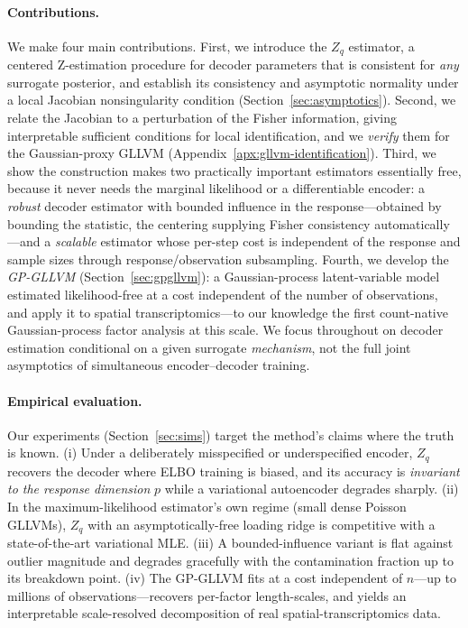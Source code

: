 \documentclass[twoside,11pt]{article}
\begin{document}
\paragraph{Contributions.}
We make four main contributions.
First, we introduce the $Z_q$ estimator, a centered Z-estimation procedure for decoder parameters that is consistent for \emph{any} surrogate posterior, and establish its consistency and asymptotic normality under a local Jacobian nonsingularity condition (Section~\ref{sec:asymptotics}).
Second, we relate the Jacobian to a perturbation of the Fisher information, giving interpretable sufficient conditions for local identification, and we \emph{verify} them for the Gaussian-proxy GLLVM (Appendix~\ref{apx:gllvm-identification}).
Third, we show the construction makes two practically important estimators essentially free, because it never needs the marginal likelihood or a differentiable encoder: a \emph{robust} decoder estimator with bounded influence in the response---obtained by bounding the statistic, the centering supplying Fisher consistency automatically---and a \emph{scalable} estimator whose per-step cost is independent of the response and sample sizes through response/observation subsampling.
Fourth, we develop the \emph{GP-GLLVM} (Section~\ref{sec:gpgllvm}): a Gaussian-process latent-variable model estimated likelihood-free at a cost independent of the number of observations, and apply it to spatial transcriptomics---to our knowledge the first count-native Gaussian-process factor analysis at this scale.
We focus throughout on decoder estimation conditional on a given surrogate \emph{mechanism}, not the full joint asymptotics of simultaneous encoder--decoder training.

\paragraph{Empirical evaluation.}
Our experiments (Section~\ref{sec:sims}) target the method's claims where the truth is known.
(i) Under a deliberately misspecified or underspecified encoder, $Z_q$ recovers the decoder where ELBO training is biased, and its accuracy is \emph{invariant to the response dimension} $p$ while a variational autoencoder degrades sharply.
(ii) In the maximum-likelihood estimator's own regime (small dense Poisson GLLVMs), $Z_q$ with an asymptotically-free loading ridge is competitive with a state-of-the-art variational MLE.
(iii) A bounded-influence variant is flat against outlier magnitude and degrades gracefully with the contamination fraction up to its breakdown point.
(iv) The GP-GLLVM fits at a cost independent of $n$---up to millions of observations---recovers per-factor length-scales, and yields an interpretable scale-resolved decomposition of real spatial-transcriptomics data.
\end{document}
